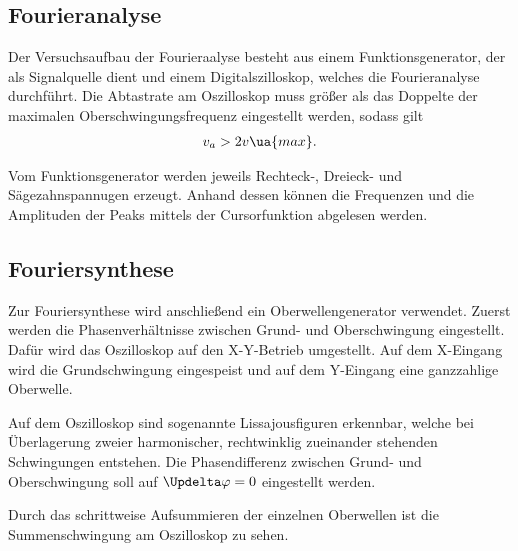 \subsection{Fourieranalyse}
Der Versuchsaufbau der Fourieraalyse besteht aus einem Funktionsgenerator,
der als Signalquelle dient und einem Digitalszilloskop, welches die Fourieranalyse
durchführt.
\newline
Die Abtastrate am Oszilloskop muss größer als das Doppelte der maximalen
Oberschwingungsfrequenz eingestellt werden, sodass gilt
\begin{align}
  v_a > 2v\ua{max}.
\end{align}

Vom Funktionsgenerator werden jeweils Rechteck-, Dreieck- und Sägezahnspannugen erzeugt.
Anhand dessen können die Frequenzen und die Amplituden der Peaks mittels der
Cursorfunktion abgelesen werden.

\subsection{Fouriersynthese}
Zur Fouriersynthese wird anschließend ein Oberwellengenerator verwendet.
Zuerst werden die Phasenverhältnisse zwischen Grund- und Oberschwingung eingestellt.
Dafür wird das Oszilloskop auf den X-Y-Betrieb umgestellt. Auf dem X-Eingang wird die
Grundschwingung eingespeist und auf dem Y-Eingang eine ganzzahlige Oberwelle.

Auf dem Oszilloskop sind sogenannte Lissajousfiguren erkennbar, welche bei Überlagerung
zweier harmonischer, rechtwinklig zueinander stehenden Schwingungen entstehen.
Die Phasendifferenz zwischen Grund- und Oberschwingung soll auf $\Updelta\varphi = 0$
eingestellt werden.

Durch das schrittweise Aufsummieren der einzelnen Oberwellen ist die Summenschwingung
am Oszilloskop zu sehen.
